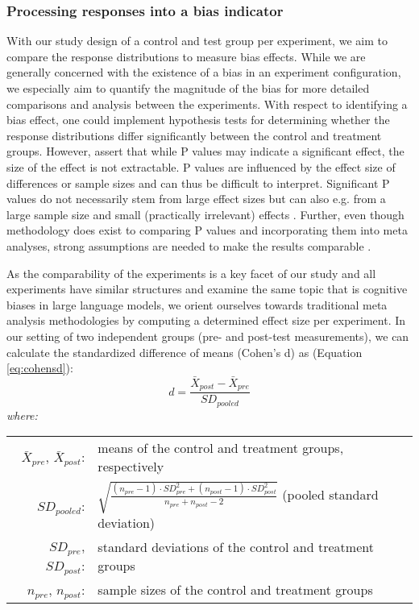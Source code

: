 \subsubsection{Processing responses into a bias indicator}
\label{methodologies:biasdetector}
\par With our study design of a control and test group per experiment, we aim to compare the response distributions to measure bias effects. While we are generally concerned with the existence of a bias in an experiment configuration, we especially aim to quantify the magnitude of the bias for more detailed comparisons and analysis between the experiments. With respect to identifying a bias effect, one could implement hypothesis tests for determining whether the response distributions differ significantly between the control and treatment groups. However, \textcite{sullivan2012using} assert that while P values may indicate a significant effect, the size of the effect is not extractable. P values are influenced by the effect size of differences or sample sizes and can thus be difficult to interpret. Significant P values do not necessarily stem from large effect sizes but can also e.g. from a large sample size and small (practically irrelevant) effects \parencite{borenstein2021introduction,sullivan2012using}. Further, even though methodology does exist to comparing P values and incorporating them into meta analyses, strong assumptions are needed to make the results comparable \parencite{borenstein2021introduction}.

\par As the comparability of the experiments is a key facet of our study and all experiments have similar structures and examine the same topic that is cognitive biases in large language models, we orient ourselves towards traditional meta analysis methodologies by computing a determined effect size per experiment. In our setting of two independent groups (pre- and post-test measurements), we can calculate the standardized difference of means (Cohen's d) as \parencite{borenstein2021introduction,cooper2019handbook, goulet2018review,morris2002combining, nakagawa2023quantitative} (Equation \ref{eq:cohensd}):
\begin{equation} \label{eq:cohensd}
d = \frac{\bar{X}_{post} - \bar{X}_{pre}}{SD_{pooled}}
\end{equation}
\hspace{0.5cm} \textit{where:} \\
\hspace*{3em}
\begin{tabular}{rl}
    $\bar{X}_{pre}$, $\bar{X}_{post}$:& means of the control and treatment groups, respectively \\
    $SD_{pooled}$:& $\sqrt{\frac{(n_{pre} - 1) \cdot SD_{pre}^2 + (n_{post} - 1) \cdot SD_{post}^2}{n_{pre} + n_{post} - 2}}$ (pooled standard deviation) \\
    $SD_{pre}$, $SD_{post}$:& standard deviations of the control and treatment groups \\
    $n_{pre}$, $n_{post}$:& sample sizes of the control and treatment groups
\end{tabular} \\

